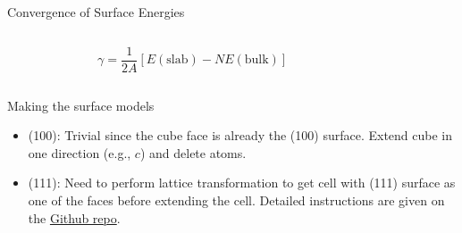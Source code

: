 \documentclass[aspectratio=169]{beamer}
\begin{document}
    \begin{frame}{Convergence of Surface Energies}
        \begin{columns}
            \begin{figure}
                \centering
            \end{figure}
            \begin{equation*}
                \gamma = \frac{1}{2A} [ E(\mathrm{slab})-NE(\mathrm{bulk})]
            \end{equation*}

        \end{columns}
    \end{frame}
    \begin{frame}{Making the surface models}
        \begin{itemize}
            \item (100): Trivial since the cube face is already the (100) surface. Extend cube in one direction (e.g., $c$) and delete atoms.
            \item (111): Need to perform lattice transformation to get cell with (111) surface as one of the faces before extending the cell. Detailed instructions are given on the \href{https://github.com/materialsvirtuallab/nano266/tree/master/labs/lab4}{Github repo}.
        \end{itemize}
    \end{frame}
\end{document}
